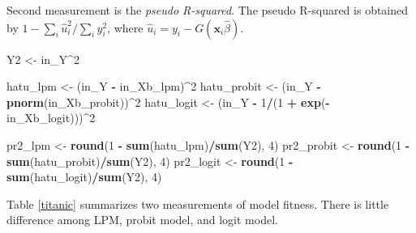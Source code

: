\documentclass[
  12pt,
]{article}
\newenvironment{Shaded}{\begin{snugshade}}{\end{snugshade}}
\newcommand{\DecValTok}[1]{\textcolor[rgb]{0.00,0.00,0.81}{#1}}
\newcommand{\KeywordTok}[1]{\textcolor[rgb]{0.13,0.29,0.53}{\textbf{#1}}}
\newcommand{\NormalTok}[1]{#1}
\newcommand{\OperatorTok}[1]{\textcolor[rgb]{0.81,0.36,0.00}{\textbf{#1}}}
\newcommand{\StringTok}[1]{\textcolor[rgb]{0.31,0.60,0.02}{#1}}
\begin{document}
Second measurement is the \emph{pseudo R-squared}.
The pseudo R-squared is obtained by \(1 - \sum_i \hat{u}_i^2/ \sum_i y_i^2\),
where \(\hat{u}_i = y_i - G(\mathbf{x}_i \hat{\beta})\).

\begin{Shaded}
\begin{Highlighting}[]
\NormalTok{Y2 \textless{}{-}}\StringTok{ }\NormalTok{in\_Y}\OperatorTok{\^{}}\DecValTok{2}

\NormalTok{hatu\_lpm \textless{}{-}}\StringTok{ }\NormalTok{(in\_Y }\OperatorTok{{-}}\StringTok{ }\NormalTok{in\_Xb\_lpm)}\OperatorTok{\^{}}\DecValTok{2}
\NormalTok{hatu\_probit \textless{}{-}}\StringTok{ }\NormalTok{(in\_Y }\OperatorTok{{-}}\StringTok{ }\KeywordTok{pnorm}\NormalTok{(in\_Xb\_probit))}\OperatorTok{\^{}}\DecValTok{2}
\NormalTok{hatu\_logit \textless{}{-}}\StringTok{ }\NormalTok{(in\_Y }\OperatorTok{{-}}\StringTok{ }\DecValTok{1}\OperatorTok{/}\NormalTok{(}\DecValTok{1} \OperatorTok{+}\StringTok{ }\KeywordTok{exp}\NormalTok{(}\OperatorTok{{-}}\NormalTok{in\_Xb\_logit)))}\OperatorTok{\^{}}\DecValTok{2}

\NormalTok{pr2\_lpm \textless{}{-}}\StringTok{ }\KeywordTok{round}\NormalTok{(}\DecValTok{1} \OperatorTok{{-}}\StringTok{ }\KeywordTok{sum}\NormalTok{(hatu\_lpm)}\OperatorTok{/}\KeywordTok{sum}\NormalTok{(Y2), }\DecValTok{4}\NormalTok{)}
\NormalTok{pr2\_probit \textless{}{-}}\StringTok{ }\KeywordTok{round}\NormalTok{(}\DecValTok{1} \OperatorTok{{-}}\StringTok{ }\KeywordTok{sum}\NormalTok{(hatu\_probit)}\OperatorTok{/}\KeywordTok{sum}\NormalTok{(Y2), }\DecValTok{4}\NormalTok{)}
\NormalTok{pr2\_logit \textless{}{-}}\StringTok{ }\KeywordTok{round}\NormalTok{(}\DecValTok{1} \OperatorTok{{-}}\StringTok{ }\KeywordTok{sum}\NormalTok{(hatu\_logit)}\OperatorTok{/}\KeywordTok{sum}\NormalTok{(Y2), }\DecValTok{4}\NormalTok{)}
\end{Highlighting}
\end{Shaded}

Table \ref{titanic} summarizes two measurements of model fitness.
There is little difference among LPM, probit model, and logit model.
\end{document}

